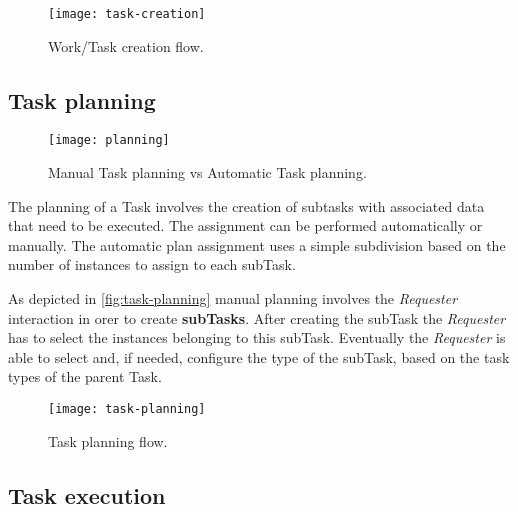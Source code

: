 \begin{figure}[htb]
    \centering
    \texttt{[image: task-creation]}
    \caption{Work/Task creation flow.}
    \label{fig:task-creation}
\end{figure}



\subsection{Task planning}
\begin{figure}[htb]
    \centering
    \texttt{[image: planning]}
    \caption{Manual Task planning vs Automatic Task planning.}
    \label{fig:auto-manual-planning}
\end{figure}
The planning of a Task involves the creation of subtasks with associated data
that need to be executed. The assignment can be performed automatically or
manually. The automatic plan assignment uses a simple subdivision based on the
number of instances to assign to each subTask.

As depicted in \autoref{fig:task-planning} manual planning involves the
\emph{Requester} interaction in orer to create \textbf{subTasks}. After creating
the subTask the \emph{Requester} has to select the instances belonging to this
subTask. Eventually the \emph{Requester} is able to select and, if needed,
configure the type of the subTask, based on the task types of the parent Task.
\begin{figure}[htb]
    \centering
    \texttt{[image: task-planning]}
    \caption{Task planning flow.}
    \label{fig:task-planning}
\end{figure}



\subsection{Task execution}




